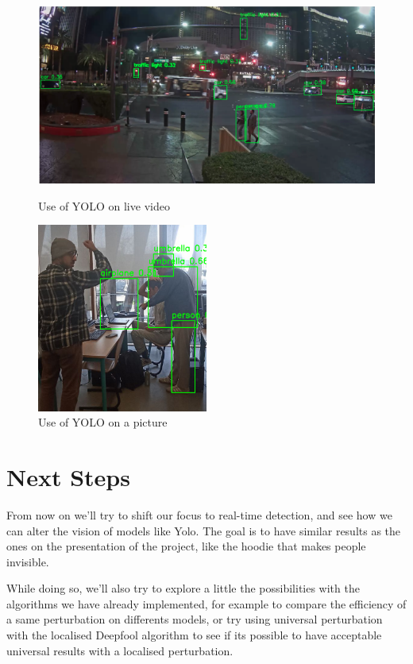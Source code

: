 \documentclass{article}
\begin{document}
\begin{figure}[ht]
    \begin{minipage}[t]{0.49\textwidth}
        \centering
        \includegraphics[width=\textwidth]{results/YOLO-Video.png}
        \caption{Use of YOLO on live video}
        \label{fig:Yolo Video}
    \end{minipage}
    \hfill
    \begin{minipage}[t]{0.49\textwidth}
        \centering
        \includegraphics[width=0.5\textwidth]{results/YOLO-Photo.png}
        \caption{Use of YOLO on a picture}
        \label{fig:Yolo Photo}
    \end{minipage}
\end{figure}

\section{Next Steps}

From now on we'll try to shift our focus to real-time detection, and see how we can alter the vision of models like Yolo. The goal is to have similar results as the ones on the presentation of the project, like the hoodie that makes people invisible.

While doing so, we'll also try to explore a little the possibilities with the algorithms we have already implemented, for example to compare the efficiency of a same perturbation on differents models, or try using universal perturbation with the localised Deepfool algorithm to see if its possible to have acceptable universal results with a localised perturbation.
\end{document}
